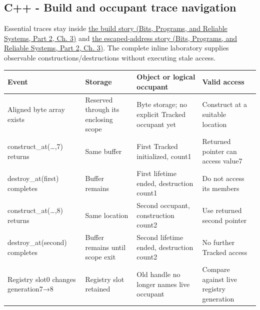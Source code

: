 \subsection{C++ - Build and occupant trace navigation}\label{appendix-92ff77d4dfdc-c---build-and-occupant-trace-navigation}

\hypertarget{appendix-92ff77d4dfdc-c---build-and-occupant-trace-navigation}{}

Essential traces stay inside \href{../01-Bits-Programs-and-Reliable-Systems-P02/main.pdf\#nameddest=01-foundations-i-ch003-following-one-call-through-the-build}{the build story (Bits, Programs, and Reliable Systems, Part 2, Ch. 3)} and \href{../01-Bits-Programs-and-Reliable-Systems-P02/main.pdf\#nameddest=01-foundations-i-ch003-following-an-escaped-address-through-time}{the escaped-address story (Bits, Programs, and Reliable Systems, Part 2, Ch. 3)}. The complete inline laboratory supplies observable constructions/destructions without executing stale access.

{\def\LTcaptype{none} %
\begin{longtable}[]{@{}
  >{\raggedright\arraybackslash}p{}
  >{\raggedright\arraybackslash}p{}
  >{\raggedright\arraybackslash}p{}
  >{\raggedright\arraybackslash}p{}@{}}
\toprule\noalign{}
\begin{minipage}[b]{\linewidth}\raggedright
Event
\end{minipage} & \begin{minipage}[b]{\linewidth}\raggedright
Storage
\end{minipage} & \begin{minipage}[b]{\linewidth}\raggedright
Object or logical occupant
\end{minipage} & \begin{minipage}[b]{\linewidth}\raggedright
Valid access
\end{minipage} \\
\midrule\noalign{}
\endhead
\bottomrule\noalign{}
\endlastfoot
Aligned byte array exists & Reserved through its enclosing scope & Byte storage; no explicit Tracked occupant yet & Construct at a suitable location \\
construct\_at(\ldots,7) returns & Same buffer & First Tracked initialized, count1 & Returned pointer can access value7 \\
destroy\_at(first) completes & Buffer remains & First lifetime ended, destruction count1 & Do not access its members \\
construct\_at(\ldots,8) returns & Same location & Second occupant, construction count2 & Use returned second pointer \\
destroy\_at(second) completes & Buffer remains until scope exit & Second lifetime ended, destruction count2 & No further Tracked access \\
Registry slot0 changes generation7→8 & Registry slot retained & Old handle no longer names live occupant & Compare against live registry generation \\
\end{longtable}
}

